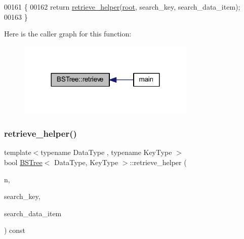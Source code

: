 \begin{DoxyCode}
00161 \{
00162     \textcolor{keywordflow}{return} \hyperlink{class_b_s_tree_ae8721d0a76719bc95e6b48420b5be302}{retrieve\_helper}(\hyperlink{class_b_s_tree_a83534afce9094181ac031f9f596a8625}{root}, search\_key, search\_data\_item);
00163 \}
\end{DoxyCode}
Here is the caller graph for this function\+:
\nopagebreak
\begin{figure}[H]
\begin{center}
\leavevmode
\includegraphics[width=240pt]{class_b_s_tree_a464aa205470b150038ff35dfa01d89b8_icgraph}
\end{center}
\end{figure}
\hypertarget{class_b_s_tree_ae8721d0a76719bc95e6b48420b5be302}{}\label{class_b_s_tree_ae8721d0a76719bc95e6b48420b5be302} 
\subsubsection{\texorpdfstring{retrieve\+\_\+helper()}{retrieve\_helper()}}
{\footnotesize\ttfamily template$<$typename Data\+Type , typename Key\+Type $>$ \\
bool \hyperlink{class_b_s_tree}{B\+S\+Tree}$<$ Data\+Type, Key\+Type $>$\+::retrieve\+\_\+helper (\begin{DoxyParamCaption}\item[{\hyperlink{class_b_s_tree_1_1_b_s_tree_node}{B\+S\+Tree\+Node} $\ast$}]{n,  }\item[{const Key\+Type \&}]{search\+\_\+key,  }\item[{Data\+Type \&}]{search\+\_\+data\+\_\+item }\end{DoxyParamCaption}) const\hspace{0.3cm}{\ttfamily [protected]}}


